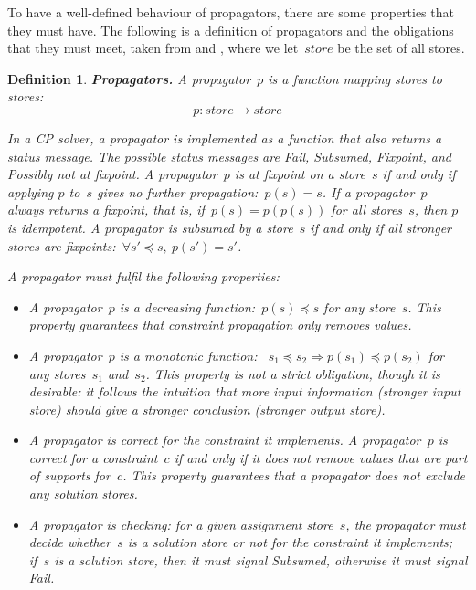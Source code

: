 \documentclass[a4paper,11pt]{article}
\newtheorem{definition}{Definition}
\numberwithin{equation}{section}
\begin{document}
To have a well-defined behaviour of propagators, there are some properties that
they must have. The following is a definition of propagators and the obligations
that they must meet, taken from \cite{SchulteCarlsson:FDsys} and \cite{Gecode:MPG},
where we let~$store$ be the set of all stores.

\begin{definition} \label{def:prop}
  \textbf{Propagators.} A \emph{propagator}~$p$ is a function mapping stores to stores:
  \begin{equation*}
    p: store \to store
  \end{equation*}

  In a CP solver, a propagator is implemented as a function that also returns 
  a \emph{status message}.
  The possible status messages are \emph{Fail}, \emph{Subsumed},
  \emph{Fixpoint}, and \emph{Possibly not at fixpoint}. 
  A propagator~$p$ is at \emph{fixpoint} on a store~$s$ if and only if applying 
  $p$ to~$s$ gives no further propagation:~$p(s) = s$.
  If a propagator~$p$ always returns a fixpoint, that is, 
  if~$p(s) = p(p(s))$ for all stores~$s$, then $p$ is \emph{idempotent}.
  A propagator is \emph{subsumed} by a store~$s$ if and only if
  all stronger stores are fixpoints:~$\forall s'\preceq s, \ p(s')=s'$.

  A propagator must fulfil the following properties:

  \begin{itemize}
  \item A propagator~$p$ is a decreasing function:~$p(s) \preceq s$ for any store~$s$.
    This property guarantees that constraint propagation only removes values.

  \item A propagator~$p$ is a monotonic function:
    ~$s_1 \preceq s_2 \Rightarrow p(s_1) \preceq p(s_2)$
    for any stores~$s_1$ and~$s_2$.
    This property is not a strict obligation, though it is desirable:
    it follows the intuition that more input information (stronger input store)
    should give a stronger conclusion (stronger output store).
    
  \item A propagator is correct for the constraint it implements.
    A propagator~$p$
    is \emph{correct} for a constraint~$c$ if and only if it does not
    remove values that are part of supports for~$c$.
    This property guarantees that a propagator does not exclude any
    solution stores.

  \item A propagator is \emph{checking}: for a given assignment store~$s$, the propagator
    must decide whether~$s$ is a solution store or not for the constraint it
    implements; if~$s$ is a solution store, then it must signal \emph{Subsumed},
    otherwise it must signal \emph{Fail}.


\end{itemize}
\end{definition}
\end{document}
